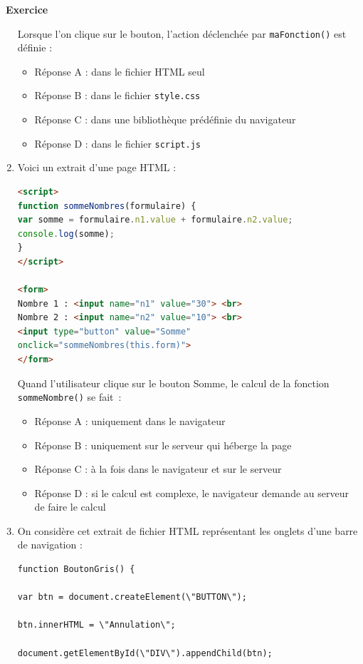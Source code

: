 \documentclass[
  11pt,
]{article}
\newcommand{\passthrough}[1]{#1}
\providecommand{\tightlist}{%
  \setlength{\itemsep}{0pt}\setlength{\parskip}{0pt}}
\newcounter{exo}
\newenvironment{exercice}[1]
{\par \medskip   \addtocounter{exo}{1} \noindent  
\begin{bclogo}[arrondi =0.1,   noborder = true, logo=\bccrayon, marge=4]{~\textbf{Exercice} \textbf{\theexo} {\itshape #1} }  \par}
{
\end{bclogo}
 \par \bigskip }
\begin{document}
\begin{exercice}{}
\begin{enumerate}
  Lorsque l'on clique sur le bouton, l'action déclenchée par
  \passthrough{\lstinline!maFonction()!} est définie :

  \begin{itemize}
  \tightlist
  \item
    Réponse A : dans le fichier HTML seul
  \item
    Réponse B : dans le fichier \passthrough{\lstinline!style.css!}
  \item
    Réponse C : dans une bibliothèque prédéfinie du navigateur
  \item
    Réponse D : dans le fichier \passthrough{\lstinline!script.js!}
  \end{itemize}
\item
  Voici un extrait d'une page HTML :

\begin{lstlisting}[language=HTML]
<script>
function sommeNombres(formulaire) {
var somme = formulaire.n1.value + formulaire.n2.value;
console.log(somme);
}
</script>

<form>
Nombre 1 : <input name="n1" value="30"> <br>
Nombre 2 : <input name="n2" value="10"> <br>
<input type="button" value="Somme"
onclick="sommeNombres(this.form)">
</form>
\end{lstlisting}

  Quand l'utilisateur clique sur le bouton Somme, le calcul de la
  fonction \passthrough{\lstinline!sommeNombre()!} se fait~:

  \begin{itemize}
  \tightlist
  \item
    Réponse A : uniquement dans le navigateur
  \item
    Réponse B : uniquement sur le serveur qui héberge la page
  \item
    Réponse C : à la fois dans le navigateur et sur le serveur
  \item
    Réponse D : si le calcul est complexe, le navigateur demande au
    serveur de faire le calcul
  \end{itemize}
\item
  On considère cet extrait de fichier HTML représentant les onglets
  d'une barre de navigation :

\begin{lstlisting}
function BoutonGris() {

var btn = document.createElement(\"BUTTON\");

btn.innerHTML = \"Annulation\";

document.getElementById(\"DIV\").appendChild(btn);


\end{lstlisting}
\end{enumerate}
\end{exercice}
\end{document}
